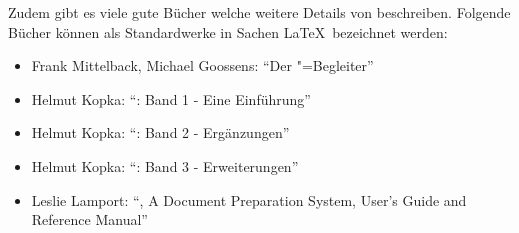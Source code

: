 Zudem gibt es viele gute Bücher welche weitere Details von \DMLLaTeX{} beschreiben. Folgende Bücher können als Standardwerke in Sachen \LaTeX \ bezeichnet werden:

\begin{itemize}
	\item{Frank Mittelback, Michael Goossens: \enquote{Der \DMLLaTeX"=Begleiter}\cite{DerLaTeXBegleiter}}
	\item{Helmut Kopka: \enquote{\DMLLaTeX: Band 1 - Eine Einführung}\cite{kopka:band1}}
	\item{Helmut Kopka: \enquote{\DMLLaTeX: Band 2 - Ergänzungen}\cite{kopka:band2}}
	\item{Helmut Kopka: \enquote{\DMLLaTeX: Band 3 - Erweiterungen}\cite{kopka:band3}}
	\item{Leslie Lamport: \enquote{\DMLLaTeX, A Document Preparation System, User's Guide and Reference Manual}\cite{lamport:latex}}
\end{itemize}




